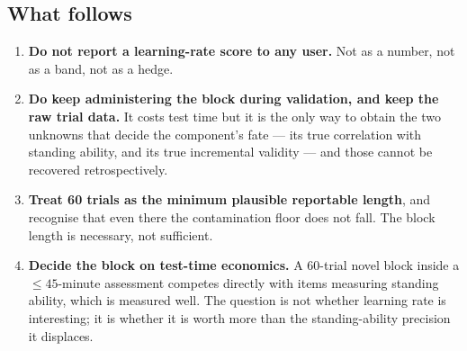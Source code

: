 \documentclass[11pt,a4paper]{article}
\begin{document}

\subsection{What follows}

\begin{enumerate}[leftmargin=1.4em,itemsep=0.2em]
\item \textbf{Do not report a learning-rate score to any user.} Not as a number,
not as a band, not as a hedge.
\item \textbf{Do keep administering the block during validation, and keep the
raw trial data.} It costs test time but it is the only way to obtain the two
unknowns that decide the component's fate --- its true correlation with standing
ability, and its true incremental validity --- and those cannot be recovered
retrospectively.
\item \textbf{Treat 60 trials as the minimum plausible reportable length}, and
recognise that even there the contamination floor does not fall. The block
length is necessary, not sufficient.
\item \textbf{Decide the block on test-time economics.} A 60-trial novel block
inside a ${\le}45$-minute assessment competes directly with items measuring
standing ability, which is measured well. The question is not whether learning
rate is interesting; it is whether it is worth more than the standing-ability
precision it displaces.
\end{enumerate}
\end{document}

